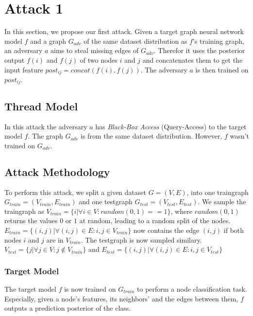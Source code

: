   \section{Attack 1}

    In this section, we propose our first attack. 
    Given a target graph neural network model $f$ and a graph $G_{adv}$ of the same dataset distribution as $f$'s training graph, an adversary $a$ aims to steal missing edges of $G_{adv}$.
    Therefor it uses the posterior output $f(i)$ and $f(j)$ of two nodes $i$ and $j$ and concatenates them to get the input feature $post_{ij} = concat(f(i),f(j))$. The adversary $a$ is then trained on $post_{ij}$.

    \subsection{Thread Model}

      In this attack the adversary $a$ has \emph{Black-Box Access} (Query-Access) to the target model $f$. 
      The graph $G_{adv}$ is from the same dataset distribution. 
      However, $f$ wasn't trained on $G_{adv}$.

    \subsection{Attack Methodology}

      To perform this attack, we split a given dataset $G = (V, E)$, into one traingraph $G_{train} = (V_{train}, E_{train})$ and one testgraph $G_{test} = (V_{test}, E_{test})$.  
      We sample the traingraph as $V_{train} = \{i | \forall i \in V: random(0, 1) == 1\}$, where $random(0, 1)$ returns the values $0$ or $1$ at random, leading to a random split of the nodes.
      $E_{train} = \{(i, j) | \forall (i,j) \in E: i, j \in V_{train}\}$ now contains the edge $(i,j)$ if both nodes $i$ and $j$ are in $V_{train}$.
      The testgraph is now sampled similary.
      $V_{test} = \{j | \forall j \in V: j \not\in V_{train}\}$ and $E_{test} = \{(i, j) | \forall (i,j) \in E: i, j \in V_{test}\}$

      \subsubsection{Target Model}

        The target model $f$ is now trained on $G_{train}$ to perform a node classification task.
        Especially, given a node's features, its neighbors' and the edges between them, $f$ outputs a prediction posterior of the class.

